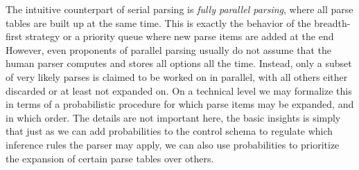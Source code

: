 The intuitive counterpart of serial parsing is \emph{fully parallel parsing}, where all parse tables are built up at the same time.
This is exactly the behavior of the breadth-first strategy or a priority queue where new parse items are added at the end
However, even proponents of parallel parsing usually do not assume that the human parser computes and stores all options all the time.
Instead, only a subset of very likely parses is claimed to be worked on in parallel, with all others either discarded or at least not expanded on.
On a technical level we may formalize this in terms of a probabilistic procedure for which parse items may be expanded, and in which order.
The details are not important here, the basic insights is simply that just as we can add probabilities to the control schema to regulate which inference rules the parser may apply, we can also use probabilities to prioritize the expansion of certain parse tables over others.

